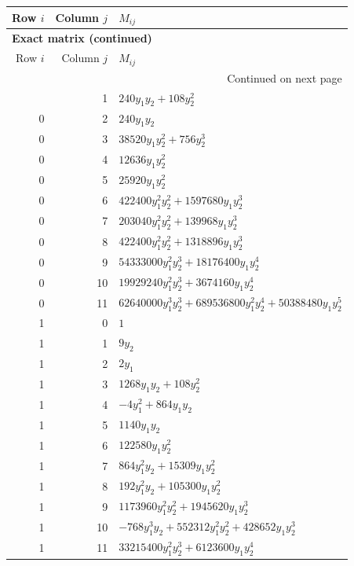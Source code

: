 \documentclass[10pt,a4paper]{article}
\begin{document}
{\small\setlength{\tabcolsep}{7pt}\begin{longtable}{rrp{125mm}}
\toprule Row $i$ & Column $j$ & $M_{ij}$\\\midrule\endfirsthead
\multicolumn{3}{l}{\textbf{Exact matrix (continued)}}\\
\toprule Row $i$ & Column $j$ & $M_{ij}$\\\midrule\endhead
\midrule\multicolumn{3}{r}{Continued on next page}\\\endfoot\bottomrule\endlastfoot
0 & 1 & $240 y_{1} y_{2} + 108 y_{2}^{2}$\\
0 & 2 & $240 y_{1} y_{2}$\\
0 & 3 & $38520 y_{1} y_{2}^{2} + 756 y_{2}^{3}$\\
0 & 4 & $12636 y_{1} y_{2}^{2}$\\
0 & 5 & $25920 y_{1} y_{2}^{2}$\\
0 & 6 & $422400 y_{1}^{2} y_{2}^{2} + 1597680 y_{1} y_{2}^{3}$\\
0 & 7 & $203040 y_{1}^{2} y_{2}^{2} + 139968 y_{1} y_{2}^{3}$\\
0 & 8 & $422400 y_{1}^{2} y_{2}^{2} + 1318896 y_{1} y_{2}^{3}$\\
0 & 9 & $54333000 y_{1}^{2} y_{2}^{3} + 18176400 y_{1} y_{2}^{4}$\\
0 & 10 & $19929240 y_{1}^{2} y_{2}^{3} + 3674160 y_{1} y_{2}^{4}$\\
0 & 11 & $62640000 y_{1}^{3} y_{2}^{3} + 689536800 y_{1}^{2} y_{2}^{4} + 50388480 y_{1} y_{2}^{5}$\\
1 & 0 & $1$\\
1 & 1 & $9 y_{2}$\\
1 & 2 & $2 y_{1}$\\
1 & 3 & $1268 y_{1} y_{2} + 108 y_{2}^{2}$\\
1 & 4 & $- 4 y_{1}^{2} + 864 y_{1} y_{2}$\\
1 & 5 & $1140 y_{1} y_{2}$\\
1 & 6 & $122580 y_{1} y_{2}^{2}$\\
1 & 7 & $864 y_{1}^{2} y_{2} + 15309 y_{1} y_{2}^{2}$\\
1 & 8 & $192 y_{1}^{2} y_{2} + 105300 y_{1} y_{2}^{2}$\\
1 & 9 & $1173960 y_{1}^{2} y_{2}^{2} + 1945620 y_{1} y_{2}^{3}$\\
1 & 10 & $- 768 y_{1}^{3} y_{2} + 552312 y_{1}^{2} y_{2}^{2} + 428652 y_{1} y_{2}^{3}$\\
1 & 11 & $33215400 y_{1}^{2} y_{2}^{3} + 6123600 y_{1} y_{2}^{4}$\\

\end{longtable}}
\end{document}
